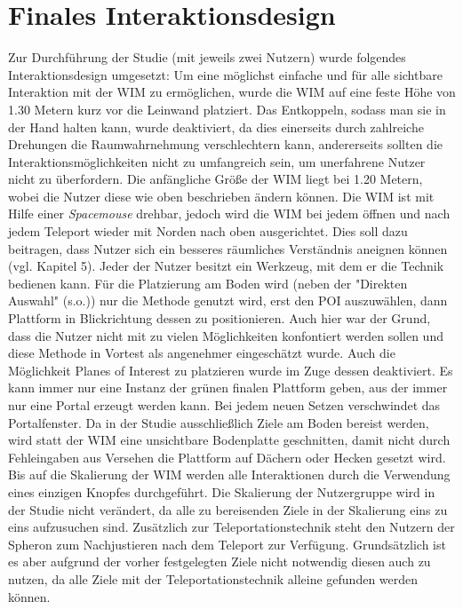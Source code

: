 \section{Finales Interaktionsdesign}
Zur Durchführung der Studie (mit jeweils zwei Nutzern) wurde folgendes Interaktionsdesign umgesetzt:
Um eine möglichst einfache und für alle sichtbare Interaktion mit der WIM zu ermöglichen, wurde die WIM auf eine feste Höhe von 1.30 Metern kurz vor die Leinwand platziert. Das Entkoppeln, sodass man sie in der Hand halten kann, wurde deaktiviert, da dies einerseits durch zahlreiche Drehungen die Raumwahrnehmung verschlechtern kann, andererseits sollten die Interaktionsmöglichkeiten nicht zu umfangreich sein, um unerfahrene Nutzer nicht zu überfordern. Die anfängliche Größe der WIM liegt bei 1.20 Metern, wobei die Nutzer diese wie oben beschrieben ändern können.
Die WIM ist mit Hilfe einer \textit{Spacemouse} drehbar, jedoch wird die WIM bei jedem öffnen und nach jedem Teleport wieder mit Norden nach oben ausgerichtet.
Dies soll dazu beitragen, dass Nutzer sich ein besseres räumliches Verständnis aneignen können (vgl. Kapitel 5).
Jeder der Nutzer besitzt ein Werkzeug, mit dem er die Technik bedienen kann. 
Für die Platzierung am Boden wird (neben der "Direkten Auswahl" (s.o.)) nur die Methode genutzt wird, erst den POI auszuwählen, dann Plattform in Blickrichtung dessen zu positionieren. Auch hier war der Grund, dass die Nutzer nicht mit zu vielen Möglichkeiten konfontiert werden sollen und diese Methode in Vortest als angenehmer eingeschätzt wurde.
Auch die Möglichkeit Planes of Interest zu platzieren wurde im Zuge dessen deaktiviert. Es kann immer nur eine Instanz der grünen finalen Plattform geben, aus der immer nur eine Portal erzeugt werden kann.
Bei jedem neuen Setzen verschwindet das Portalfenster.
Da in der Studie ausschließlich Ziele am Boden bereist werden, wird statt der WIM eine unsichtbare Bodenplatte geschnitten, damit nicht durch Fehleingaben aus Versehen die Plattform auf Dächern oder Hecken gesetzt wird.
Bis auf die Skalierung der WIM werden alle Interaktionen durch die Verwendung eines einzigen Knopfes durchgeführt.
Die Skalierung der Nutzergruppe wird in der Studie nicht verändert, da alle zu bereisenden Ziele in der Skalierung eins zu eins aufzusuchen sind.
Zusätzlich zur Teleportationstechnik steht den Nutzern der Spheron zum Nachjustieren nach dem Teleport zur Verfügung. Grundsätzlich ist es aber aufgrund der vorher festgelegten Ziele nicht notwendig diesen auch zu nutzen, da alle Ziele mit der Teleportationstechnik alleine gefunden werden können.